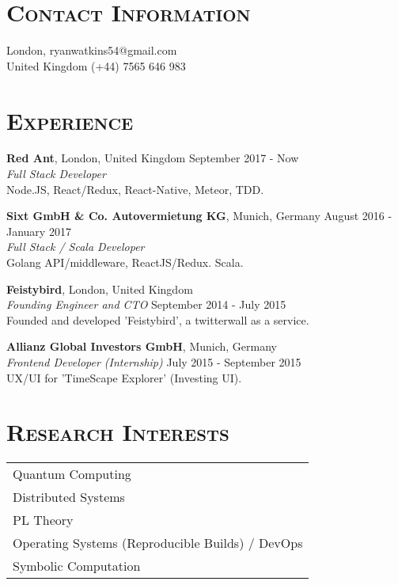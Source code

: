 \documentclass[line, margin, 10pt]{res}
\begin{document}
\renewcommand{\namefont}{ \LARGE \bf }


\begin{resume}

\section{\textsc{Contact Information}}
London,  \hfill {ryanwatkins54@gmail.com}\\
United Kingdom \hfill {(+44) 7565 646 983 }\\

\section{\textsc{Experience}}

{\bf Red Ant}, London, United Kingdom {\hfill September 2017 -  Now}\\
{\it Full Stack Developer} \\
Node.JS, React/Redux, React-Native, Meteor, TDD.

{\bf Sixt GmbH \& Co. Autovermietung KG}, Munich, Germany {\hfill August 2016 - January 2017}\\
{\it Full Stack / Scala Developer} \\
Golang API/middleware, ReactJS/Redux. Scala.

{\bf Feistybird}, London, United Kingdom \\
\textit{Founding Engineer and CTO} \hfill {September 2014 - July 2015}\\
Founded and developed 'Feistybird', a twitterwall as a service.

{\bf Allianz Global Investors GmbH}, Munich, Germany\\
{\it Frontend Developer (Internship)} {\hfill July 2015 - September 2015}\\
UX/UI for 'TimeScape Explorer' (Investing UI).

\section{\textsc{Research Interests}}
\begin{tabular}[t]{@{} p{6.0 in}  @{}}
  Quantum Computing\\
  Distributed Systems\\
  PL Theory\\
  Operating Systems (Reproducible Builds) / DevOps\\
  Symbolic Computation\\
\end{tabular}



\end{resume}
\end{document}
